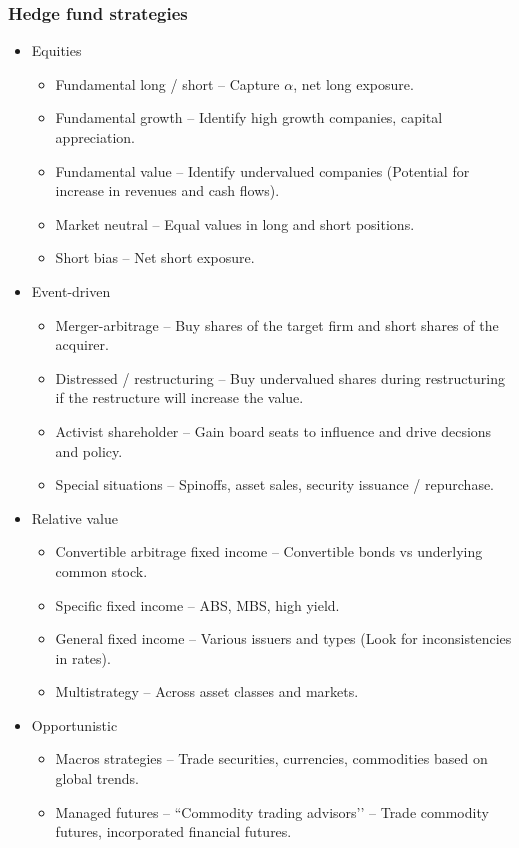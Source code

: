 \documentclass[../notes_compiled.tex]{subfiles}
\begin{document}
\subsubsection{Hedge fund strategies}
\begin{itemize}
\item Equities
\begin{itemize}
\item Fundamental long / short -- Capture $\alpha$, net long exposure.
\item Fundamental growth -- Identify high growth companies, capital appreciation.
\item Fundamental value -- Identify undervalued companies (Potential for increase in revenues and cash flows).
\item Market neutral -- Equal values in long and short positions.
\item Short bias -- Net short exposure.
\end{itemize}
\item Event-driven
\begin{itemize}
\item Merger-arbitrage -- Buy shares of the target firm and short shares of the acquirer.
\item Distressed / restructuring -- Buy undervalued shares during restructuring if the restructure will increase the value.
\item Activist shareholder -- Gain board seats to influence and drive decsions and policy.
\item Special situations -- Spinoffs, asset sales, security issuance / repurchase.
\end{itemize}
\item Relative value
\begin{itemize}
\item Convertible arbitrage fixed income -- Convertible bonds vs underlying common stock.
\item Specific fixed income -- ABS, MBS, high yield.
\item General fixed income -- Various issuers and types (Look for inconsistencies in rates).
\item Multistrategy -- Across asset classes and markets.
\end{itemize}
\item Opportunistic
\begin{itemize}
\item Macros strategies -- Trade securities, currencies, commodities based on global trends.
\item Managed futures -- ``Commodity trading advisors’’ -- Trade commodity futures, incorporated financial futures.
\end{itemize}
\end{itemize}
\end{document}
